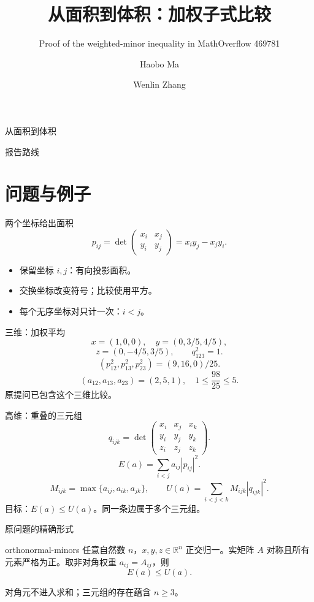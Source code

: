 \documentclass{beamer}
\title{从面积到体积：加权子式比较}
\subtitle{Proof of the weighted-minor inequality in MathOverflow 469781}
\author{Haobo Ma \and Wenlin Zhang}
\begin{document}
\begin{frame}{从面积到体积}
\titlepage
{}
\end{frame}
\begin{frame}{报告路线}
\tableofcontents
{}
\end{frame}
\section{问题与例子}
\begin{frame}{两个坐标给出面积}
\[
p_{ij}=\det\begin{pmatrix}x_i&x_j\\y_i&y_j\end{pmatrix}
=x_i y_j-x_j y_i.
\]
\begin{itemize}
\item 保留坐标 $i,j$：有向投影面积。
\item 交换坐标改变符号；比较使用平方。
\item 每个无序坐标对只计一次：$i<j$。
\end{itemize}
\end{frame}
\begin{frame}{三维：加权平均}
\[
x=(1,0,0),\quad y=(0,3/5,4/5),
\]
\[
z=(0,-4/5,3/5),\qquad q_{123}^2=1.
\]
\[
(p_{12}^2,p_{13}^2,p_{23}^2)=(9,16,0)/25.
\]
\[
(a_{12},a_{13},a_{23})=(2,5,1),\quad
1\le\frac{98}{25}\le5.
\]
\small 原提问已包含这个三维比较。
\end{frame}
\begin{frame}{高维：重叠的三元组}
\[
q_{ijk}=\det\begin{pmatrix}x_i&x_j&x_k\\y_i&y_j&y_k\\z_i&z_j&z_k\end{pmatrix}.
\]
\[
E(a)=\sum_{i<j}a_{ij}|p_{ij}|^2.
\]
\[
M_{ijk}=\max\{a_{ij},a_{ik},a_{jk}\},
\qquad U(a)=\sum_{i<j<k}M_{ijk}|q_{ijk}|^2.
\]
目标：$E(a)\le U(a)$。同一条边属于多个三元组。
\end{frame}
\begin{frame}{原问题的精确形式}
\begin{bookresult}{orthonormal-minors}
任意自然数 $n$，$x,y,z\in\mathbb R^n$ 正交归一。实矩阵 $A$ 对称且所有元素严格为正。取非对角权重 $a_{ij}=A_{ij}$，则
\[
E(a)\le U(a).
\]
\end{bookresult}
\small 对角元不进入求和；三元组的存在蕴含 $n\ge3$。
\end{frame}
\end{document}
